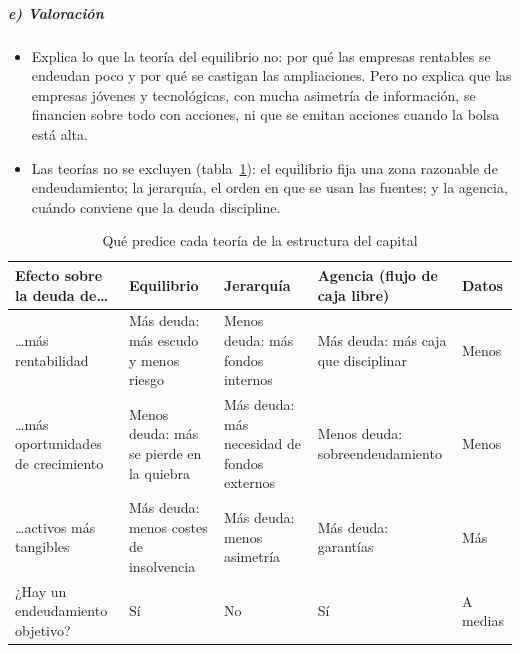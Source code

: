 \documentclass[11pt]{article}
\begin{document}
\subparagraph{e) Valoración}

\begin{itemize}
\item Explica lo que la teoría del equilibrio no: por qué las empresas rentables se endeudan poco y por qué se castigan las ampliaciones. Pero no explica que las empresas jóvenes y tecnológicas, con mucha asimetría de información, se financien sobre todo con acciones, ni que se emitan acciones cuando la bolsa está alta.
\item Las teorías no se excluyen (tabla~\ref{tab:teorias-estructura}): el equilibrio fija una zona razonable de endeudamiento; la jerarquía, el orden en que se usan las fuentes; y la agencia, cuándo conviene que la deuda discipline.
\end{itemize}

\begin{table}[H]
\centering
\caption{Qué predice cada teoría de la estructura del capital}\label{tab:teorias-estructura}
\begin{tabular}{>{\raggedright\arraybackslash}m{3.2cm}>{\centering\arraybackslash}m{2.9cm}>{\centering\arraybackslash}m{2.9cm}>{\centering\arraybackslash}m{2.9cm}>{\centering\arraybackslash}m{2.3cm}}
\toprule
\rowcolor{tceeazulpalido}\textbf{Efecto sobre la deuda de\ldots} & \textbf{Equilibrio} & \textbf{Jerarquía} & \textbf{Agencia (flujo de caja libre)} & \textbf{Datos} \\
\midrule
\ldots más rentabilidad & \textcolor{tceeverde}{Más deuda: más escudo y menos riesgo} & \textcolor{tceerojo}{Menos deuda: más fondos internos} & \textcolor{tceeverde}{Más deuda: más caja que disciplinar} & \cellcolor{tceesalvia}\textcolor{tceerojo}{Menos} \\
\ldots más oportunidades de crecimiento & \textcolor{tceerojo}{Menos deuda: más se pierde en la quiebra} & \textcolor{tceeverde}{Más deuda: más necesidad de fondos externos} & \textcolor{tceerojo}{Menos deuda: sobreendeudamiento} & \cellcolor{tceesalvia}\textcolor{tceerojo}{Menos} \\
\ldots activos más tangibles & \textcolor{tceeverde}{Más deuda: menos costes de insolvencia} & \textcolor{tceeverde}{Más deuda: menos asimetría} & \textcolor{tceeverde}{Más deuda: garantías} & \cellcolor{tceesalvia}\textcolor{tceeverde}{Más} \\
¿Hay un endeudamiento objetivo? & Sí & No & Sí & \cellcolor{tceesalvia}A medias \\
\bottomrule
\end{tabular}
\end{table}
\end{document}
